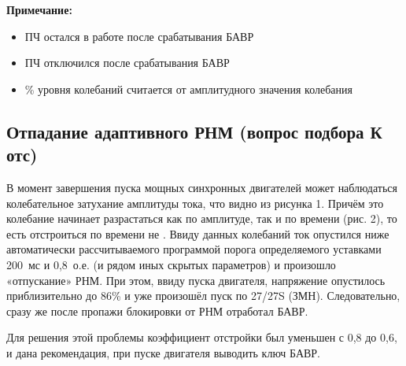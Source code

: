 
\textbf{Примечание:}
\begin{itemize}[leftmargin=*,itemsep=0pt]
    \item[+] ПЧ остался в работе после срабатывания БАВР
    \item[-] ПЧ отключился после срабатывания БАВР
    \item[\%] \% уровня колебаний считается от амплитудного значения колебания
\end{itemize}

\subsection{Отпадание адаптивного РНМ (вопрос подбора К отс)}
\label{sec:ch1_adaptive_dropout}

В момент завершения пуска мощных синхронных двигателей может наблюдаться колебательное затухание амплитуды тока, что видно из рисунка 1. Причём это колебание начинает разрастаться как по амплитуде, так и по времени (рис. 2), то есть отстроиться по времени не . Ввиду данных колебаний ток опустился ниже автоматически рассчитываемого программой порога определяемого уставками 200~мс и 0,8~о.е. (и рядом иных скрытых параметров) и произошло «отпускание» РНМ. При этом, ввиду пуска двигателя, напряжение опустилось приблизительно до 86\% и уже произошёл пуск по 27/27S (ЗМН). Следовательно, сразу же после пропажи блокировки от РНМ отработал БАВР.

Для решения этой проблемы коэффициент отстройки был уменьшен с 0,8 до 0,6, и дана рекомендация, при пуске двигателя выводить ключ БАВР.

